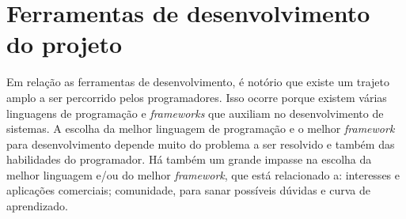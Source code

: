 \section{\textbf{Ferramentas de desenvolvimento do projeto}}
\label{ferramentas-de-desenvolvimento-do-projeto}

Em relação as ferramentas de desenvolvimento, é notório que existe um trajeto amplo a ser percorrido pelos programadores. Isso ocorre porque existem várias linguagens de programação e \textit{frameworks} que auxiliam no desenvolvimento de sistemas. A escolha da melhor linguagem de programação e o melhor \textit{framework} para desenvolvimento depende muito do problema a ser resolvido e também das habilidades do programador. Há também um grande impasse na escolha da melhor linguagem e/ou do melhor \textit{framework}, que está relacionado a: interesses e aplicações comerciais; comunidade, para sanar possíveis dúvidas e curva de aprendizado.







%



